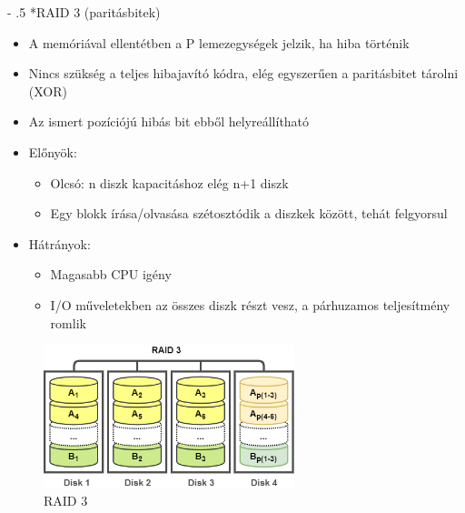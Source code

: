 \documentclass[tikz,12pt,margin=0px]{article}
\makeatletter
\renewcommand\paragraph{%
	\@startsection{paragraph}{4}{0mm}%
	{-\baselineskip}%
	{.5\baselineskip}%
	{\normalfont\normalsize\bfseries}}
\makeatother
\begin{document}
	\paragraph*{RAID 3 (paritásbitek)}

    \begin{itemize}[topsep=8pt,itemsep=4pt,partopsep=4pt, parsep=4pt]
        \item A memóriával ellentétben a P lemezegységek jelzik, ha hiba történik
        \item Nincs szükség a teljes hibajavító kódra, elég egyszerűen a paritásbitet tárolni (XOR)
        \item Az ismert pozíciójú hibás bit ebből helyreállítható
        \item Előnyök:
        \begin{itemize}
            \item Olcsó: n diszk kapacitáshoz elég n+1 diszk
            \item Egy blokk írása/olvasása szétosztódik a diszkek között, tehát felgyorsul
        \end{itemize}
        \item Hátrányok:
        \begin{itemize}
            \item Magasabb CPU igény
            \item I/O műveletekben az összes diszk részt vesz, a párhuzamos teljesítmény romlik
        \end{itemize}
    \end{itemize}

    \begin{figure}[H]
        \centering
        \includegraphics[width=0.65\textwidth]{img/raid3.png}
        \caption{RAID 3}
        \label{ref:raid3}
    \end{figure}
\end{document}
